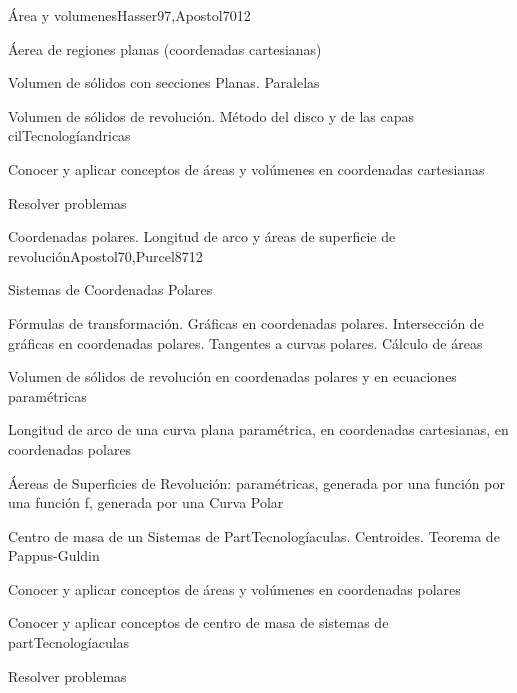 \begin{syllabus}
\begin{unit}{Área y volumenes}{Hasser97,Apostol70}{12}
\begin{topics}
      \item Áerea de regiones planas (coordenadas cartesianas)
      \item Volumen de sólidos con secciones Planas. Paralelas
      \item Volumen de sólidos de revolución. Método del disco y de las capas cilTecnologíandricas
\end{topics}

\begin{unitgoals}
	\item Conocer y aplicar conceptos de áreas y volúmenes en coordenadas cartesianas
	\item Resolver problemas
\end{unitgoals}
\end{unit}

\begin{unit}{Coordenadas polares. Longitud de arco y áreas de superficie de revolución}{Apostol70,Purcel87}{12}
\begin{topics}
	\item Sistemas de Coordenadas Polares
	\item Fórmulas de transformación. Gráficas en coordenadas polares. Intersección de gráficas en coordenadas polares. Tangentes a curvas polares. Cálculo de áreas
	\item Volumen de sólidos de revolución en coordenadas polares y en ecuaciones paramétricas
	\item Longitud de arco de una curva plana paramétrica, en coordenadas cartesianas, en  coordenadas polares
	\item Áereas de Superficies de Revolución: paramétricas,  generada por una función por una  función f, generada por una Curva  Polar
	\item Centro de masa de un Sistemas de PartTecnologíaculas. Centroides. Teorema de Pappus-Guldin
\end{topics}

\begin{unitgoals}
	\item Conocer y aplicar conceptos de áreas y volúmenes en coordenadas polares
	\item Conocer y aplicar conceptos de centro de masa de sistemas de partTecnologíaculas
	\item Resolver problemas
\end{unitgoals}
\end{unit}


\end{syllabus}

